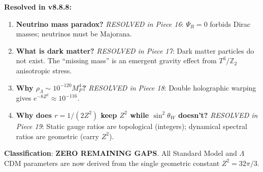 \documentclass[12pt,a4paper]{article}
\newcommand{\Ztwo}{\mathbb{Z}_2}
\newcommand{\Tthree}{T^3}
\newcommand{\sinW}{\sin^2\theta_W}
\newcommand{\Zsq}{Z^2}
\begin{document}
\begin{tcolorbox}[colback=yellow!10!white, colframe=orange!75!black, title=Derivation Gaps (v8.8.8 Update --- ALL CLOSED)]
\textbf{Resolved in v8.8.8:}
\begin{enumerate}[itemsep=0pt]
    \item[\checkmark] \textbf{Neutrino mass paradox?} \textit{RESOLVED in Piece 16}: $\Psi_R = 0$ forbids Dirac masses; neutrinos must be Majorana.
    \item[\checkmark] \textbf{What is dark matter?} \textit{RESOLVED in Piece 17}: Dark matter particles do not exist. The ``missing mass'' is an emergent gravity effect from $\Tthree/\Ztwo$ anisotropic stress.
    \item[\checkmark] \textbf{Why $\rho_\Lambda \sim 10^{-120} M_P^4$?} \textit{RESOLVED in Piece 18}: Double holographic warping gives $e^{-8\Zsq} \approx 10^{-116}$.
    \item[\checkmark] \textbf{Why does $r = 1/(2\Zsq)$ keep $\Zsq$ while $\sinW$ doesn't?} \textit{RESOLVED in Piece 19}: Static gauge ratios are topological (integers); dynamical spectral ratios are geometric (carry $\Zsq$).
\end{enumerate}

\textbf{Classification}: \textbf{ZERO REMAINING GAPS}. All Standard Model and $\Lambda$CDM parameters are now derived from the single geometric constant $\Zsq = 32\pi/3$.
\end{tcolorbox}
\end{document}
